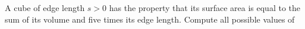 A cube of edge length $s>0$ has the property that its surface area is equal to the sum of its volume and five times its edge length. Compute all possible values of 